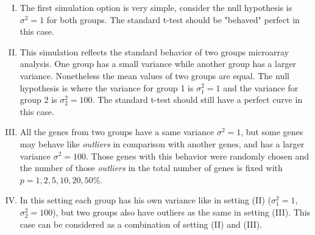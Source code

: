 \begin{enumerate}[(I)]
	\item The first simulation option is very simple, consider the null hypothesis is $\sigma^2 = 1$ for both groups. The standard t-test should be "behaved" perfect in this case.
	\item This simulation reflects the standard behavior of two groups microarray analysis. One group has a small variance while another group has a larger variance. Nonetheless the mean values of two groups are equal. The null hypothesis is where the variance for group 1 is $\sigma_1^2 = 1$ and the variance for group 2 is $\sigma_2^2 = 100$. The standard t-test should still have a perfect curve in this case.
	\item All the genes from two groups have a same variance $\sigma^2 = 1$, but some genes may behave like {\it outliers} in comparison with another genes, and has a larger variance $\sigma^2 = 100$. Those genes with this behavior were randomly chosen and the number of those {\it outliers} in the total number of genes is fixed with $p = 1, 2, 5, 10, 20, 50\%$.
	\item In this setting each group has his own variance like in setting (II) ($\sigma_1^2 = 1$, $\sigma_2^2 = 100$), but two groups also have outliers as the same in setting (III). This case can be considered as a combination of setting (II) and (III).
\end{enumerate}	
